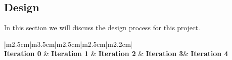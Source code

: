 \documentclass[11pt]{article}
\begin{document}
\subsection{Design}
In this section we will discuss the design process for this project.

\begin{center}

		
		
		
		
		
		

\begin{table}[!htb]
		
		\centering
		\begin{tabular}{|m{2.5cm}|m{3.5cm}|m{2.5cm}|m{2.5cm}|m{2.2cm}|}
		\hline
		 \\
		\hline
		\textbf{Iteration 0} & \textbf{Iteration 1} & \textbf{Iteration 2} & \textbf{Iteration 3}& \textbf{Iteration 4} \\ \hline
		

\end{tabular}
\end{table}
\end{center}
\end{document}
